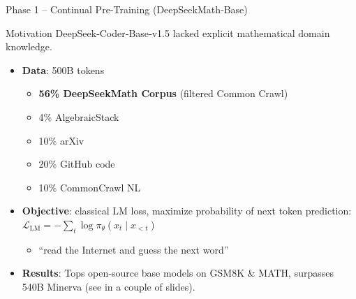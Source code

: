 \documentclass[9pt]{beamer}
\begin{document}
\begin{frame}{Phase 1 – Continual Pre‑Training (DeepSeekMath‑Base)}
  \begin{block}{Motivation}
    DeepSeek‑Coder‑Base‑v1.5 lacked explicit mathematical domain knowledge.
  \end{block}
  \begin{itemize}
    \item \textbf{Data}: 500B tokens
    \begin{itemize}
        \item \textbf{56\% DeepSeekMath Corpus} (filtered Common Crawl)
        \item 4\% AlgebraicStack
        \item 10\% arXiv
        \item 20\% GitHub code
        \item 10\% CommonCrawl NL
    \end{itemize}
    \pause
    \vfill
    \item \textbf{Objective}: classical LM loss, maximize probability of next token prediction:
    $\displaystyle\mathcal L_{\text{LM}}=-\sum_t\log\pi_\theta(x_t\mid x_{<t})$
    \begin{itemize}
        \item “read the Internet and guess the next word”
    \end{itemize}
    \pause
    \vfill
    \item \textbf{Results}: Tops open‑source base models on GSM8K \& MATH, surpasses 540B Minerva (see in a couple of slides).
  \end{itemize}
\end{frame}
\end{document}
